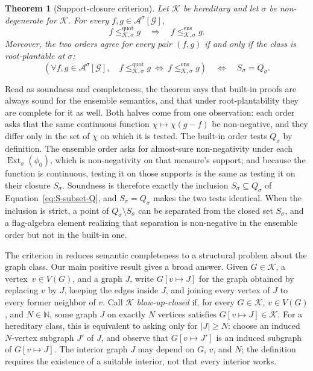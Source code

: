 \documentclass[acmsmall,screen=true,acmthm=false]{acmart}
\newtheorem{theorem}{Theorem}[section]
\newcommand{\FlagAlg}[1]{\mathcal{A}^{#1}}
\newcommand{\boldparagraph}[1]{\noindentparagraph{\textnormal{\textbf{#1}}}}
\newcommand{\Ext}{\operatorname{Ext}}
\begin{document}
\begin{theorem}[Support-closure criterion]\label{thm:support-closure-summary}
Let \(\mathcal K\) be hereditary and let \(\sigma\) be non-degenerate for
\(\mathcal K\).  For every \(f,g\in\FlagAlg{\sigma}[\mathcal G]\),
\[
  f\leq^{\mathrm{quot}}_{\mathcal K,\sigma}g
  \quad\Longrightarrow\quad
  f\leq^{\mathrm{ens}}_{\mathcal K,\sigma}g.
\]
Moreover, the two orders agree for every pair \((f,g)\) if and only if the class
is root-plantable at \(\sigma\):
\[
  \left(
    \forall f,g\in\FlagAlg{\sigma}[\mathcal G],\quad
    f\leq^{\mathrm{quot}}_{\mathcal K,\sigma}g
    \ \Longleftrightarrow\
    f\leq^{\mathrm{ens}}_{\mathcal K,\sigma}g
  \right)
  \quad\Longleftrightarrow\quad
  S_\sigma=Q_\sigma.
\]
\end{theorem}

Read as soundness and completeness, the theorem says that built-in proofs are
always sound for the ensemble semantics, and that under root-plantability they
are complete for it as well.  Both halves come from one observation: each
order asks that the same continuous function \(\chi\mapsto\chi(g-f)\) be
non-negative, and they differ only in the set of \(\chi\) on which it is
tested.  The built-in order tests \(Q_\sigma\) by definition.  The ensemble
order asks for almost-sure non-negativity under each
\(\Ext_\sigma(\phi_0)\), which is non-negativity on that measure's support;
and because the function is continuous, testing it on those supports is the
same as testing it on their closure \(S_\sigma\).  Soundness is therefore
exactly the inclusion \(S_\sigma\subseteq Q_\sigma\) of
Equation~\eqref{eq:S-subset-Q}, and \(S_\sigma=Q_\sigma\) makes the two tests
identical.  When the inclusion is strict, a point of
\(Q_\sigma\setminus S_\sigma\) can be separated from the closed set
\(S_\sigma\), and a flag-algebra element realizing that separation is
non-negative in the ensemble order but not in the built-in one.

\boldparagraph{When root-plantability holds.}
The criterion in  reduces semantic completeness to a structural problem about the
graph class.  Our main positive result gives a broad answer.  Given
\(G\in\mathcal K\), a vertex~\(v\in V(G)\), and a graph \(J\), write
\(G[v\mapsto J]\) for the graph obtained by replacing \(v\) by \(J\), keeping
the edges inside \(J\), and joining every vertex of \(J\) to every former
neighbor of \(v\).  Call \(\mathcal K\) \emph{blow-up-closed} if, for every
\(G\in\mathcal K\), \(v\in V(G)\), and \(N \in \mathbb{N}\), some graph \(J\) on exactly
\(N\) vertices satisfies \(G[v\mapsto J]\in\mathcal K\).  For a hereditary
class, this is equivalent to asking only for \(\lvert J\rvert\geq N\):
choose an induced \(N\)-vertex subgraph \(J'\) of \(J\), and observe that
\(G[v\mapsto J']\) is an induced subgraph of \(G[v\mapsto J]\).  The interior
graph \(J\) may depend on \(G\), \(v\), and \(N\); the definition requires the
existence of a suitable interior, not that every interior works.
\end{document}
